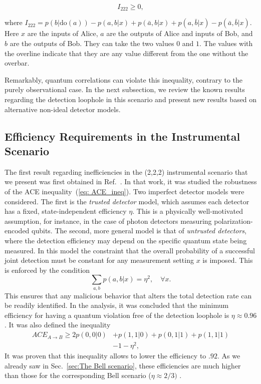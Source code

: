 \documentclass[aps,pra,reprint, superscriptaddress,showkeys]{revtex4-2}
\theoremstyle{plain}
\begin{document}
\begin{equation}\label{EQ15}
I_{222} \geq 0,
\end{equation}

where $I_{222} = p(b|\mathrm{do}(a)) - p(a, b|x) + p(\bar{a}, b|x) + p(a, \bar{b}|x) - p(\bar{a}, \bar{b}|x)$. Here \( x \) are the inputs of Alice, \( a \) are the outputs of Alice and inputs of Bob, and \( b \) are the outputs of Bob. They can take the two values $0$ and $1$. The values with the overline  indicate that they are any value different from the one without the overbar.

Remarkably, quantum correlations can violate this inequality, contrary to the purely observational case. In the next subsection, we review the known results regarding the detection loophole in this scenario and present new results based on alternative non-ideal detector models.



\subsection{Efficiency Requirements in the Instrumental Scenario}\label{map}
The first result regarding inefficiencies in the (2,2,2) instrumental scenario that we present was first obtained in  Ref.~\cite{PhysRevA.104.L010201}. In that work, it was studied the robustness of the ACE inequality~(\ref{eq: ACE_ineq}). Two imperfect detector models were considered. The first is the \textit{trusted detector} model, which assumes each detector has a fixed, state-independent efficiency $\eta$. This is a physically well-motivated assumption, for instance, in the case of photon detectors measuring polarization-encoded qubits. The second, more general model is that of \textit{untrusted detectors}, where the detection efficiency may depend on the specific quantum state being measured. In this model the constraint that the overall probability of a successful joint detection must be constant for any measurement setting $x$ is imposed. This is enforced by the condition
\begin{equation}
    \sum_{a,b} p(a, b|x) = \eta^2, \quad \forall x.
\end{equation}
This ensures that any malicious behavior that alters the total detection rate can be readily identified. 
In the analysis, it was concluded that the minimum efficiency for having a quantum violation free of the detection loophole is $\eta \approx 0.96$. It was also defined the inequality 
\begin{align}
    ACE_{A\rightarrow B} \geq
2p(0, 0|0) &+ p(1, 1|0) + p(0, 1|1) + p(1, 1|1)\nonumber \\&- 1-\eta^2,\label{eq: ACE_ineq_cao}
\end{align}
It was proven  that this inequality allows to lower the efficiency to $.92$. As we already saw in Sec.~\ref{sec:The Bell scenario}, these efficiencies are much higher than those for the corresponding Bell scenario ($\eta \approx 2/3)$ \cite{Eberhard93}.
\end{document}
